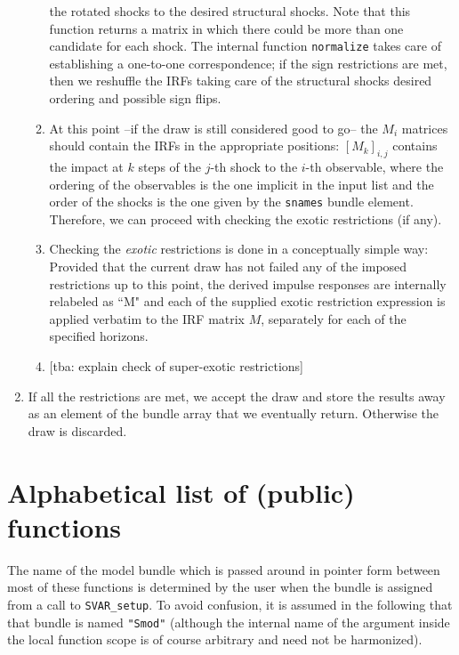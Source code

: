 \documentclass[a4paper,10pt]{article}
\begin{document}
\begin{enumerate}
\begin{enumerate}
      the rotated shocks to the desired structural shocks. Note that this
      function returns a matrix in which there could be more than one candidate
      for each shock. The internal function \texttt{normalize} takes care of
      establishing a one-to-one correspondence; if the sign restrictions are
      met, then we reshuffle the IRFs taking care of the structural shocks
      desired ordering and possible sign flips.
    \item At this point --if the draw is still considered good to go-- the $M_i$
      matrices should contain the IRFs in the appropriate positions:
      $[M_k]_{i,j}$ contains the impact at $k$ steps of the $j$-th shock to the
      $i$-th observable, where the ordering of the observables is the one
      implicit in the input list and the order of the shocks is the one given by
      the \texttt{snames} bundle element. Therefore, we can proceed with
      checking the exotic restrictions (if any).
    \item Checking the \emph{exotic} restrictions is done in a conceptually
      simple way: Provided that the current draw has not failed any of the
      imposed restrictions up to this point, the derived impulse responses are
      internally relabeled as ``M" and each of the supplied exotic restriction
      expression is applied verbatim to the IRF matrix $M$, separately for each
      of the specified horizons.
    \item{} [tba: explain check of super-exotic restrictions]  
      
    \end{enumerate}
  \item If all the restrictions are met, we accept the draw and store the
    results away as an element of the bundle array that we eventually
    return. Otherwise the draw is discarded.
\end{enumerate}

\clearpage

\section{Alphabetical list of (public) functions}
\label{sec:syntax}

The name of the model bundle which is passed around in pointer form between 
most of these functions is determined by the user when the bundle is assigned
from a call to \texttt{SVAR\_setup}. To avoid confusion, it is assumed in the
following that that bundle is named \texttt{"Smod"} (although the internal 
name of the argument inside the local function scope is of course arbitrary 
and need not be harmonized). 
\end{document}
